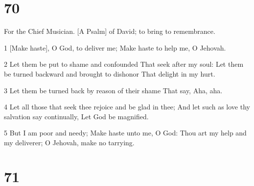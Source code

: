 \chapter{70}

\par For the Chief Musician. [A Psalm] of David; to bring to remembrance.

\par 1 [Make haste], O God, to deliver me; Make haste to help me, O Jehovah.
\par 2 Let them be put to shame and confounded That seek after my soul: Let them be turned backward and brought to dishonor That delight in my hurt.
\par 3 Let them be turned back by reason of their shame That say, Aha, aha.
\par 4 Let all those that seek thee rejoice and be glad in thee; And let such as love thy salvation say continually, Let God be magnified.
\par 5 But I am poor and needy; Make haste unto me, O God: Thou art my help and my deliverer; O Jehovah, make no tarrying.

\chapter{71}

